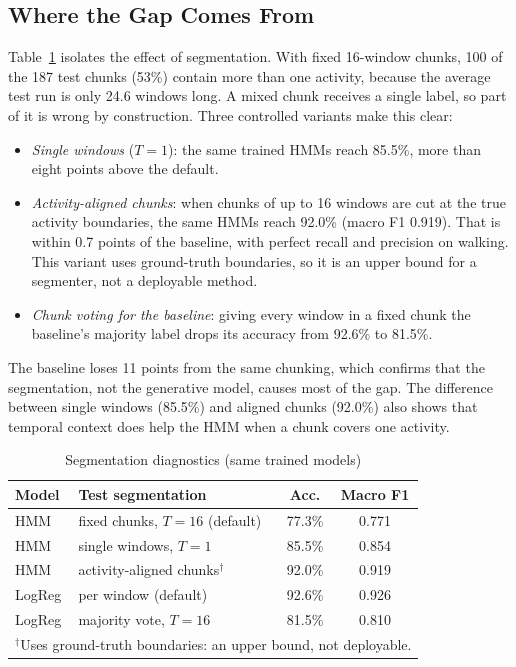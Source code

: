 \documentclass[conference]{IEEEtran}
\begin{document}
\subsection{Where the Gap Comes From}
Table~\ref{tab:diag} isolates the effect of segmentation. With fixed 16-window chunks, 100 of the 187 test chunks (53\%) contain more than one activity, because the average test run is only 24.6 windows long. A mixed chunk receives a single label, so part of it is wrong by construction. Three controlled variants make this clear:
\begin{itemize}
\item \emph{Single windows} ($T=1$): the same trained HMMs reach 85.5\%, more than eight points above the default.
\item \emph{Activity-aligned chunks}: when chunks of up to 16 windows are cut at the true activity boundaries, the same HMMs reach 92.0\% (macro F1 0.919). That is within 0.7 points of the baseline, with perfect recall and precision on walking. This variant uses ground-truth boundaries, so it is an upper bound for a segmenter, not a deployable method.
\item \emph{Chunk voting for the baseline}: giving every window in a fixed chunk the baseline's majority label drops its accuracy from 92.6\% to 81.5\%.
\end{itemize}
The baseline loses 11 points from the same chunking, which confirms that the segmentation, not the generative model, causes most of the gap. The difference between single windows (85.5\%) and aligned chunks (92.0\%) also shows that temporal context does help the HMM when a chunk covers one activity.

\begin{table}[t]
\caption{Segmentation diagnostics (same trained models)}
\label{tab:diag}
\centering
\begin{tabular}{llcc}
\toprule
Model & Test segmentation & Acc. & Macro F1 \\
\midrule
HMM & fixed chunks, $T{=}16$ (default) & 77.3\% & 0.771 \\
HMM & single windows, $T{=}1$ & 85.5\% & 0.854 \\
HMM & activity-aligned chunks$^\dagger$ & 92.0\% & 0.919 \\
LogReg & per window (default) & 92.6\% & 0.926 \\
LogReg & majority vote, $T{=}16$ & 81.5\% & 0.810 \\
\bottomrule
\multicolumn{4}{l}{\footnotesize $^\dagger$Uses ground-truth boundaries: an upper bound, not deployable.}
\end{tabular}
\end{table}
\end{document}
